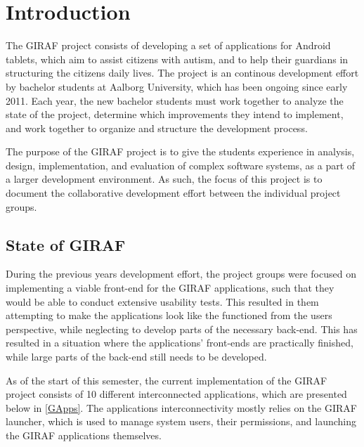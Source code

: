 \chapter{Introduction}
The GIRAF project consists of developing a set of applications for Android
tablets, which aim to assist citizens with autism, and to help their guardians in 
structuring the citizens daily lives. The project is an continous development
effort by bachelor students at Aalborg University, which has been
ongoing since early 2011. Each year, the new bachelor students must work
together to analyze the state of the project, determine which improvements
they intend to implement, and work together to organize and structure the
development process.\nl

The purpose of the GIRAF project is to give the students experience in analysis,
design, implementation, and evaluation of complex software systems, as a part of
a larger development environment. As such, the focus of this project is to
document the collaborative development effort between the individual project
groups.


\section{State of GIRAF}
During the previous years development effort, the project groups were focused
on implementing a viable front-end for the GIRAF applications, such that they
would be able to conduct extensive usability tests. This resulted in them
attempting to make the applications look like the functioned from the users
perspective, while neglecting to develop parts of the necessary back-end.
This has resulted in a situation where the applications' front-ends are
practically finished, while large parts of the back-end still needs to be
developed.\nl

As of the start of this semester, the current implementation of the GIRAF
project consists of 10 different interconnected applications, which are
presented below in \autoref{GApps}. The applications interconnectivity mostly
relies on the GIRAF launcher, which is used to manage system users, their
permissions, and launching the GIRAF applications themselves. 

